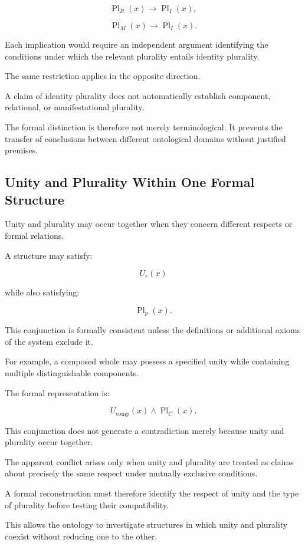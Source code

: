 \[
    \operatorname{Pl}_{R}(x)
    \rightarrow
    \operatorname{Pl}_{I}(x),
\]

\[
    \operatorname{Pl}_{M}(x)
    \rightarrow
    \operatorname{Pl}_{I}(x).
\]

Each implication would require
an independent argument identifying
the conditions under which the
relevant plurality entails identity
plurality.

The same restriction applies
in the opposite direction.

A claim of identity plurality
does not automatically establish
component, relational, or
manifestational plurality.

The formal distinction is therefore
not merely terminological. It
prevents the transfer of conclusions
between different ontological
domains without justified premises.

\subsection{Unity and Plurality Within One Formal Structure}

Unity and plurality may occur
together when they concern different
respects or formal relations.

A structure may satisfy:

\[
    U_r(x)
\]

while also satisfying:

\[
    \operatorname{Pl}_{p}(x).
\]

This conjunction is formally
consistent unless the definitions
or additional axioms of the system
exclude it.

For example, a composed whole may
possess a specified unity while
containing multiple distinguishable
components.

The formal representation is:

\[
    U_{\mathrm{comp}}(x)
    \land
    \operatorname{Pl}_{C}(x).
\]

This conjunction does not generate
a contradiction merely because
unity and plurality occur together.

The apparent conflict arises only
when unity and plurality are
treated as claims about precisely
the same respect under mutually
exclusive conditions.

A formal reconstruction must
therefore identify the respect
of unity and the type of plurality
before testing their compatibility.

This allows the ontology to
investigate structures in which
unity and plurality coexist
without reducing one to the other.

